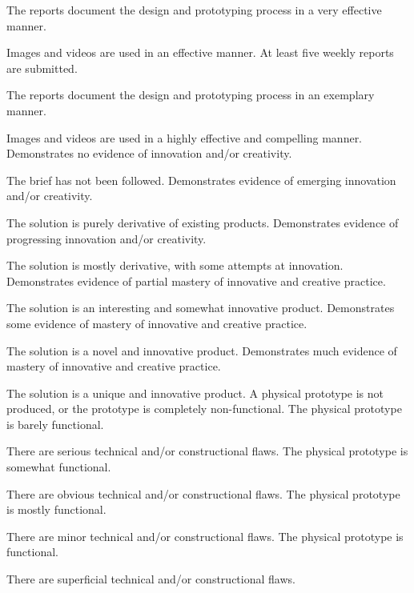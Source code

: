 \documentclass{../fal_assignment}
\begin{document}
\begin{markingrubric}
            \par The reports document the design and prototyping process in a very effective manner.
            \par Images and videos are used in an effective manner.
        \grade At least five weekly reports are submitted.
            \par The reports document the design and prototyping process in an exemplary manner.
            \par Images and videos are used in a highly effective and compelling manner.
        \grade\fail Demonstrates no evidence of innovation and/or creativity.
            \par The brief has not been followed.
        \grade Demonstrates evidence of emerging innovation and/or creativity.
            \par The solution is purely derivative of existing products.
        \grade Demonstrates evidence of progressing innovation and/or creativity.
            \par The solution is mostly derivative, with some attempts at innovation.
        \grade Demonstrates evidence of partial mastery of innovative and creative practice.
            \par The solution is an interesting and somewhat innovative product.
        \grade Demonstrates some evidence of mastery of innovative and creative practice.
            \par The solution is a novel and innovative product.
        \grade Demonstrates much evidence of mastery of innovative and creative practice.
            \par The solution is a unique and innovative product.
        \grade\fail A physical prototype is not produced, or the prototype is completely non-functional.
        \grade The physical prototype is barely functional.
            \par There are serious technical and/or constructional flaws.
        \grade The physical prototype is somewhat functional.
            \par There are obvious technical and/or constructional flaws.
        \grade The physical prototype is mostly functional.
            \par There are minor technical and/or constructional flaws.
        \grade The physical prototype is functional.
            \par There are superficial technical and/or constructional flaws.

\end{markingrubric}
\end{document}
